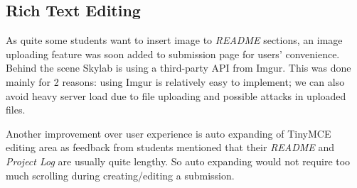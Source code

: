 \subsection{Rich Text Editing}

As quite some students want to insert image to \textit{README} sections, an image uploading feature was soon added to submission page for users' convenience. Behind the scene Skylab is using a third-party API from Imgur. This was done mainly for 2 reasons: using Imgur is relatively easy to implement; we can also avoid heavy server load due to file uploading and possible attacks in uploaded files.

Another improvement over user experience is auto expanding of TinyMCE editing area as feedback from students mentioned that their \textit{README} and \textit{Project Log} are usually quite lengthy. So auto expanding would not require too much scrolling during creating/editing a submission.
